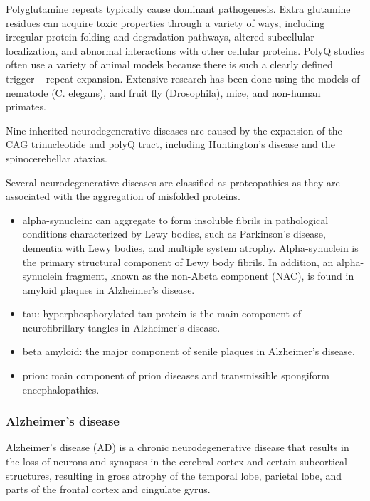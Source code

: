 Polyglutamine repeats typically cause dominant pathogenesis. Extra
glutamine residues can acquire toxic properties through a variety of
ways, including irregular protein folding and degradation pathways,
altered subcellular localization, and abnormal interactions with other
cellular proteins. PolyQ studies often use a variety of animal models
because there is such a clearly defined trigger -- repeat expansion.
Extensive research has been done using the models of nematode (C.
elegans), and fruit fly (Drosophila), mice, and non-human primates.

Nine inherited neurodegenerative diseases are caused by the expansion of
the CAG trinucleotide and polyQ tract, including Huntington's disease
and the spinocerebellar ataxias.

Several neurodegenerative diseases are classified as proteopathies as
they are associated with the aggregation of misfolded proteins.

\begin{itemize}
\tightlist
\item
  alpha-synuclein: can aggregate to form insoluble fibrils in
  pathological conditions characterized by Lewy bodies, such as
  Parkinson's disease, dementia with Lewy bodies, and multiple system
  atrophy. Alpha-synuclein is the primary structural component of Lewy
  body fibrils. In addition, an alpha-synuclein fragment, known as the
  non-Abeta component (NAC), is found in amyloid plaques in Alzheimer's
  disease.
\item
  tau: hyperphosphorylated tau protein is the main component of
  neurofibrillary tangles in Alzheimer's disease.
\item
  beta amyloid: the major component of senile plaques in Alzheimer's
  disease.
\item
  prion: main component of prion diseases and transmissible spongiform
  encephalopathies.
\end{itemize}

\hypertarget{alzheimers-disease}{%
\subsubsection{Alzheimer's disease}\label{alzheimers-disease}}

Alzheimer's disease (AD) is a chronic neurodegenerative disease that
results in the loss of neurons and synapses in the cerebral cortex and
certain subcortical structures, resulting in gross atrophy of the
temporal lobe, parietal lobe, and parts of the frontal cortex and
cingulate gyrus.

